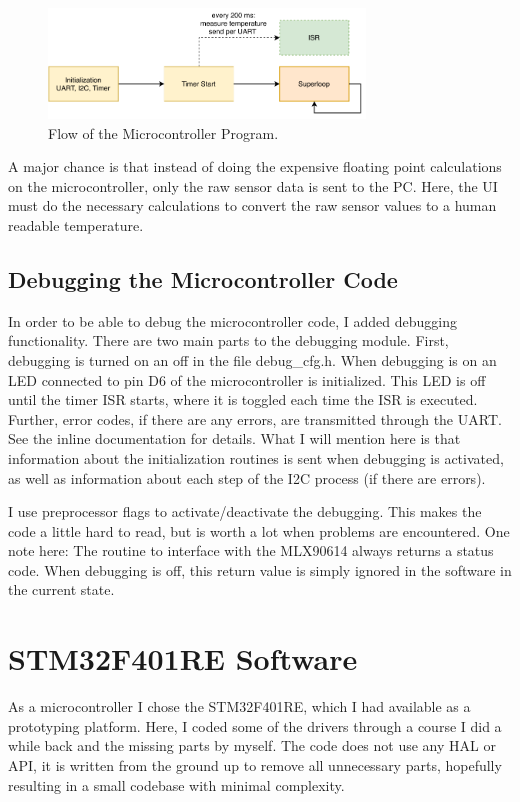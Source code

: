 \documentclass{article}[12pt]
\begin{document}
\begin{figure}[H]
  \caption{Flow of the Microcontroller Program.}
  \label{fig:swflow}
  \centering
    \includegraphics[width=0.75\textwidth]{img/swflow.pdf}
\end{figure}

A major chance is that instead of doing the expensive floating point calculations on the microcontroller, only the raw sensor data is sent to the PC. Here, the UI must do the necessary calculations to convert the raw sensor values to a human readable temperature. 

\subsection{Debugging the Microcontroller Code}

In order to be able to debug the microcontroller code, I added debugging functionality. There are two main parts to the debugging module. First, debugging is turned on an off in the file debug\_cfg.h. When debugging is on an LED connected to pin D6 of the microcontroller is initialized. This LED is off until the timer ISR starts, where it is toggled each time the ISR is executed. Further, error codes, if there are any errors, are transmitted through the UART. See the inline documentation for details. What I will mention here is that information about the initialization routines is sent when debugging is activated, as well as information about each step of the I2C process (if there are errors).

I use preprocessor flags to activate/deactivate the debugging. This makes the code a little hard to read, but is worth a lot when problems are encountered. One note here: The routine to interface with the MLX90614 always returns a status code. When debugging is off, this return value is simply ignored in the software in the current state.

\section{STM32F401RE Software}

As a microcontroller I chose the STM32F401RE, which I had available as a prototyping platform. Here, I coded some of the drivers through a course I did a while back and the missing parts by myself. The code does not use any HAL or API, it is written from the ground up to remove all unnecessary parts, hopefully resulting in a small codebase with minimal complexity.
\end{document}
